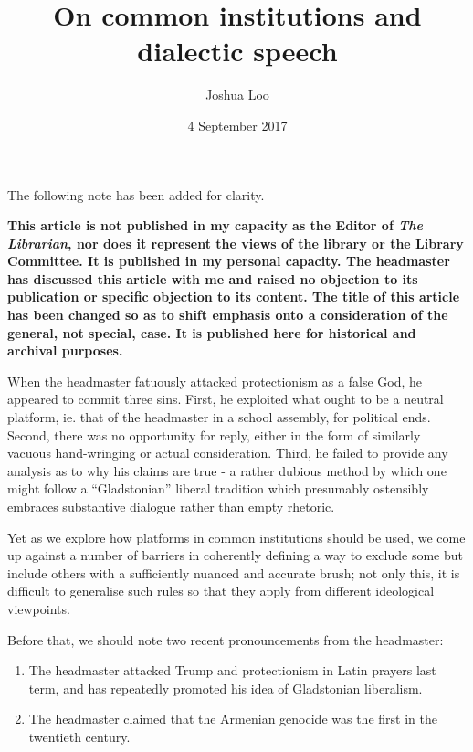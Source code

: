 \documentclass[10pt,a4paper]{article}
\begin{document}
\title{On common institutions and dialectic speech}
\date{4 September 2017}
\author{Joshua Loo}
\maketitle

\begin{multicols}{2}
	
	The following note has been added for clarity.
	
	\textbf{This article is not published in my capacity as the Editor of \textit{The Librarian}, nor does it represent the views of the library or the Library Committee. It is published in my personal capacity. The headmaster has discussed this article with me and raised no objection to its publication or specific objection to its content. The title of this article has been changed so as to shift emphasis onto a consideration of the general, not special, case. It is published here for historical and archival purposes.
	}
	
	When the headmaster fatuously attacked protectionism as a false God, he
	appeared to commit three sins. First, he exploited what ought to be a
	neutral platform, ie. that of the headmaster in a school assembly, for
	political ends. Second, there was no opportunity for reply, either in
	the form of similarly vacuous hand-wringing or actual consideration.
	Third, he failed to provide any analysis as to why his claims are true -
	a rather dubious method by which one might follow a ``Gladstonian''
	liberal tradition which presumably ostensibly embraces substantive
	dialogue rather than empty rhetoric.
	
	Yet as we explore how platforms in common institutions should be used,
	we come up against a number of barriers in coherently defining a way to
	exclude some but include others with a sufficiently nuanced and accurate
	brush; not only this, it is difficult to generalise such rules so that
	they apply from different ideological viewpoints.
	
	Before that, we should note two recent pronouncements from the headmaster:
	\begin{enumerate}
		\item The headmaster attacked Trump and protectionism in Latin prayers last term, and has repeatedly promoted his idea of Gladstonian liberalism.
		\item The headmaster claimed that the Armenian genocide was the first in the twentieth century.
	\end{enumerate}
	

\end{multicols}
\end{document}
